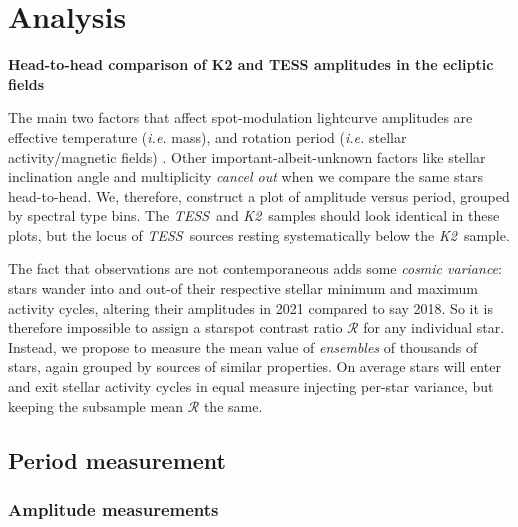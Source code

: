 \documentclass[twocolumn]{aastex631}
\newcommand{\tess}{{\it TESS}}
\newcommand{\ktwo}{{\it K2}}
\begin{document}
\section{Analysis}

\noindent \textbf{Head-to-head comparison of K2 and TESS amplitudes in the ecliptic fields}


The main two factors that affect spot-modulation lightcurve amplitudes are effective temperature (\emph{i.e.} mass), and rotation period (\emph{i.e.} stellar activity/magnetic fields) \cite{2014ApJS..211...24M}. Other important-albeit-unknown factors like stellar inclination angle and multiplicity \emph{cancel out} when we compare the same stars head-to-head. We, therefore, construct a plot of amplitude versus period, grouped by spectral type bins. The \tess\ and \ktwo\ samples should look identical in these plots, but the locus of \tess\ sources resting systematically below the \ktwo\ sample.


The fact that observations are not contemporaneous adds some \emph{cosmic variance}: stars wander into and out-of their respective stellar minimum and maximum activity cycles, altering their amplitudes in 2021 compared to say 2018. So it is therefore impossible to assign a starspot contrast ratio $\mathcal{R}$ for any individual star. Instead, we propose to measure the mean value of \emph{ensembles} of thousands of stars, again grouped by sources of similar properties. On average stars will enter and exit stellar activity cycles in equal measure injecting per-star variance, but keeping the subsample mean $\mathcal{R}$ the same.

\subsection{Period measurement}


\subsubsection{Amplitude measurements}
\end{document}

